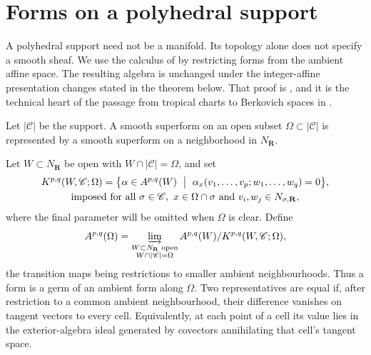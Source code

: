 \section{Forms on a polyhedral support}
\label{sec:ch10-forms}

A polyhedral support need not be a manifold. Its topology alone does not
specify a smooth sheaf. We use the calculus of  by
restricting forms from the ambient affine space. The resulting algebra is
unchanged under the integer-affine presentation changes stated in
the theorem below. That proof is
, and it is the technical
heart of the passage from tropical charts to Berkovich spaces in
.

Let $|\mathscr C|$ be the support. A smooth superform on an open subset
$\Omega\subset|\mathscr C|$ is represented by a smooth superform on a
neighborhood in $N_{\mathbf R}$.

\begin{definition}
\label{def:ch10-forms-on-support}
Let $W\subset N_{\mathbf R}$ be open with
$W\cap|\mathscr C|=\Omega$, and set
\begin{equation}
\label{eq:ch10-form-kernel}
\begin{gathered}
 K^{p,q}(W,\mathscr C;\Omega)
 =\bigl\{\alpha\in A^{p,q}(W)\ \bigm|\
   \alpha_x(v_1,\ldots,v_p;w_1,\ldots,w_q)=0\bigr\},\\
 \text{imposed for all }\sigma\in\mathscr C,\
   x\in\Omega\cap\sigma
   \text{ and } v_i,w_j\in N_{\sigma,\mathbf R},
\end{gathered}
\end{equation}
where the final parameter will be omitted when $\Omega$ is clear.  Define
\begin{equation}
\label{eq:ch10-forms-direct-limit}
 A^{p,q}(\Omega)
 =\varinjlim_{\substack{W\subset N_{\mathbf R}\text{ open}\\
                         W\cap|\mathscr C|=\Omega}}
   A^{p,q}(W)/K^{p,q}(W,\mathscr C;\Omega),
\end{equation}
the transition maps being restrictions to smaller ambient neighbourhoods.
Thus a form is a germ of an ambient form along $\Omega$.  Two representatives
are equal if, after restriction to a common ambient neighbourhood, their
difference vanishes on tangent vectors to every cell. Equivalently, at each
point of a cell its value lies in the exterior-algebra ideal
generated by covectors annihilating that cell's tangent space.
\end{definition}

